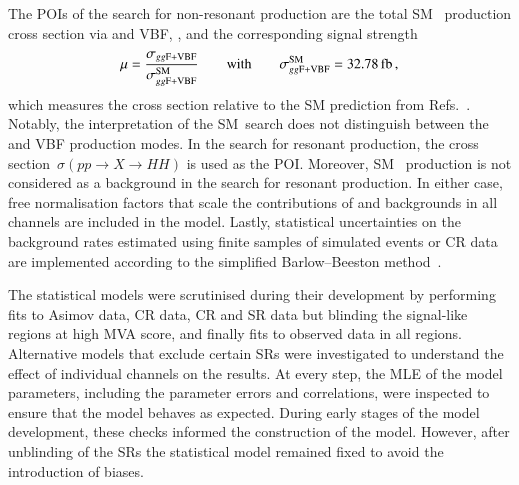 The POIs of the search for non-resonant \HH production are the total SM~\HH
production cross section via \ggF and VBF, \xsecggfvbf, and the corresponding
signal strength
\begin{align*}
  \mu = \frac{\xsecggfvbf}{\xsecggfvbf^{\text{SM}}}
  \qquad \text{with} \qquad
  \xsecggfvbf^{\text{SM}} = \SI{32.78}{\femto\barn}
  \,\text{,}
\end{align*}
which measures the cross section relative to the SM prediction from
Refs.~\cite{Grazzini:2018bsd,Dreyer:2018qbw}. Notably, the interpretation of the
SM~\HH search does not distinguish between the \ggF and VBF production modes.
In the search for resonant \HH production, the cross
section~$\sigma(pp \to X \to HH)$ is used as the POI. Moreover, SM~\HH
production is not considered as a background in the search for resonant \HH
production. In either case, free normalisation factors that scale the
contributions of \ZHF and \ttbar backgrounds in all channels are included in the
model. Lastly, statistical uncertainties on the background rates estimated using
finite samples of simulated events or CR data are implemented according to the
simplified Barlow--Beeston method~\cite{barlow1993,conway2011}.




The statistical models were scrutinised during their development by performing
fits to Asimov data, CR data, CR and SR data but blinding the signal-like
regions at high MVA score, and finally fits to observed data in all
regions. Alternative models that exclude certain SRs were investigated to
understand the effect of individual channels on the results. At every step, the
MLE of the model parameters, including the parameter errors and correlations,
were inspected to ensure that the model behaves as expected. During early stages
of the model development, these checks informed the construction of the
model. However, after unblinding of the SRs the statistical model remained fixed
to avoid the introduction of biases.


